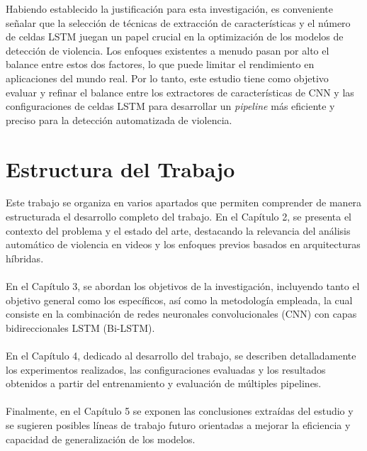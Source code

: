 Habiendo establecido la justificación para esta investigación, 
es conveniente señalar que la selección de técnicas de extracción de 
características y el número de celdas LSTM juegan un papel crucial 
en la optimización de los modelos de detección de violencia. Los enfoques 
existentes a menudo pasan por alto el balance entre estos dos factores, 
lo que puede limitar el rendimiento en aplicaciones del mundo real. 
Por lo tanto, este estudio tiene como objetivo evaluar y refinar 
el balance entre los extractores de características de CNN y las 
configuraciones de celdas LSTM para desarrollar un \textit{pipeline} más 
eficiente y preciso para la detección automatizada de violencia.

\section{Estructura del Trabajo}

Este trabajo se organiza en varios apartados que 
permiten comprender de manera estructurada el 
desarrollo completo del trabajo. En el Capítulo 2, 
se presenta el contexto del problema y el estado del arte, 
destacando la relevancia del análisis automático de 
violencia en videos y los enfoques previos basados en 
arquitecturas híbridas. \\\\

En el Capítulo 3, se abordan los 
objetivos de la investigación, incluyendo tanto el 
objetivo general como los específicos, así como la 
metodología empleada, la cual consiste en la combinación 
de redes neuronales convolucionales (CNN) con capas 
bidireccionales LSTM (Bi-LSTM). \\\\

En el Capítulo 4, dedicado al desarrollo del trabajo, se describen 
detalladamente los experimentos realizados, las 
configuraciones evaluadas y los resultados obtenidos a 
partir del entrenamiento y evaluación de múltiples pipelines.\\\\

Finalmente, en el Capítulo 5 se exponen las conclusiones extraídas del estudio y 
se sugieren posibles líneas de trabajo futuro orientadas a 
mejorar la eficiencia y capacidad de generalización de los modelos.